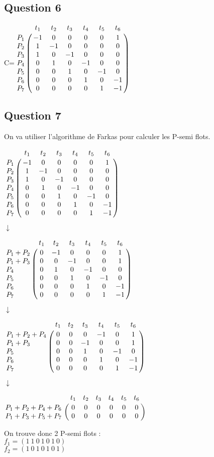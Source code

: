 \vspace{1cm}

\subsection{Question 6}

\vspace{1cm}

\begin{center}

{\Huge C}\qquad =\qquad $\bordermatrix{
&t_1&t_2&t_3&t_4&t_5&t_6\cr
P_1&-1&0&0&0&0&1\cr
P_2&1&-1&0&0&0&0\cr
P_3&1&0&-1&0&0&0\cr
P_4&0&1&0&-1&0&0\cr
P_5&0&0&1&0&-1&0\cr
P_6&0&0&0&1&0&-1\cr
P_7&0&0&0&0&1&-1\cr
}$

\end{center}

\newpage

\subsection{Question 7}
On va utiliser l'algorithme de Farkas pour calculer les P-semi flots.

\begin{center}

$\bordermatrix{
&t_1&t_2&t_3&t_4&t_5&t_6\cr
P_1&-1&0&0&0&0&1\cr
P_2&1&-1&0&0&0&0\cr
P_3&1&0&-1&0&0&0\cr
P_4&0&1&0&-1&0&0\cr
P_5&0&0&1&0&-1&0\cr
P_6&0&0&0&1&0&-1\cr
P_7&0&0&0&0&1&-1\cr
}$

{\Huge $\downarrow$}

$\bordermatrix{
&t_1&t_2&t_3&t_4&t_5&t_6\cr
P_1+P_2&0&-1&0&0&0&1\cr
P_1+P_3&0&0&-1&0&0&1\cr
P_4&0&1&0&-1&0&0\cr
P_5&0&0&1&0&-1&0\cr
P_6&0&0&0&1&0&-1\cr
P_7&0&0&0&0&1&-1\cr
}$

{\Huge $\downarrow$}

$\bordermatrix{
&t_1&t_2&t_3&t_4&t_5&t_6\cr
P_1+P_2+P_4&0&0&0&-1&0&1\cr
P_1+P_3&0&0&-1&0&0&1\cr
P_5&0&0&1&0&-1&0\cr
P_6&0&0&0&1&0&-1\cr
P_7&0&0&0&0&1&-1\cr
}$

{\Huge $\downarrow$}

$\bordermatrix{
&t_1&t_2&t_3&t_4&t_5&t_6\cr
P_1+P_2+P_4+P_6&0&0&0&0&0&0\cr
P_1+P_3+P_5+P_7&0&0&0&0&0&0\cr
}$

\vspace{1cm}

On trouve donc 2 P-semi flots :\\
$f_1 = (1\ 1\ 0\ 1\ 0\ 1\ 0)$\\
$f_2 = (1\ 0\ 1\ 0\ 1\ 0\ 1)$

\end{center}


